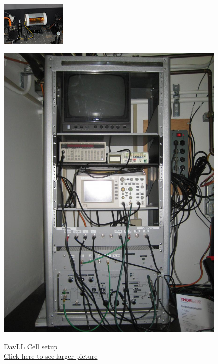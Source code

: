 \documentclass{../lab}
\begin{document}
\begin{figure}[H]
\endminipage\hfill
{}
  \href{http://experimentationlab.berkeley.edu/sites/default/files/images/DavLL_289_1.jpg}{\includegraphics[width=\linewidth,keepaspectratio]{images/120px-DavLL_289_t1.jpg}}
  \caption{DavLL Cell setup\\ \href{http://experimentationlab.berkeley.edu/sites/default/files/images/DavLL_289_1.jpg}{Click here to see larger picture}}\label{fig:DavLL_289_1.jpg}
\endminipage\hfill
{}
  \href{http://dev-physicsadv.pantheon.berkeley.edu/sites/default/files/IMG_4086.JPG}{\includegraphics[width=\linewidth,keepaspectratio]{images/IMG_4086.JPG}}

\end{figure}
\end{document}

